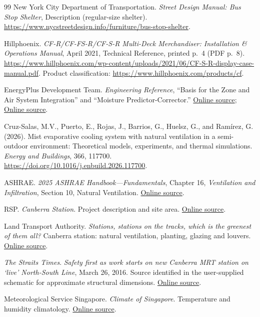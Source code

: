 \begin{thebibliography}{99}
New York City Department of Transportation.
\emph{Street Design Manual: Bus Stop Shelter}, Description (regular-size shelter).
\url{https://www.nycstreetdesign.info/furniture/bus-stop-shelter}.


Hillphoenix. \emph{CF-R/CF-FS-R/CF-S-R Multi-Deck Merchandiser: Installation \& Operations Manual}, April 2021, Technical Reference, printed p.~4 (PDF p.~8).
\url{https://www.hillphoenix.com/wp-content/uploads/2021/06/CF-S-R-display-case-manual.pdf}.
Product classification: \url{https://www.hillphoenix.com/products/cf}.


EnergyPlus Development Team. \emph{Engineering Reference},
``Basis for the Zone and Air System Integration'' and ``Moisture Predictor-Corrector.''
\href{https://energyplus.readthedocs.io/en/latest/guides/engineering-reference/2.1-basis-for-the-zone-and-air-system-integration.html}{Online source};
\href{https://energyplus.readthedocs.io/en/latest/guides/engineering-reference/2.4-moisture-predictor-corrector.html}{Online source}.


Cruz-Salas, M.V., Puerto, E., Rojas, J., Barrios, G., Huelsz, G., and Ram\'irez, G. (2026).
Mist evaporative cooling system with natural ventilation in a semi-outdoor environment: Theoretical models, experiments, and thermal simulations.
\emph{Energy and Buildings}, 366, 117700.
\url{https://doi.org/10.1016/j.enbuild.2026.117700}.

ASHRAE. \emph{2025 ASHRAE Handbook---Fundamentals}, Chapter 16,
\emph{Ventilation and Infiltration}, Section 10, Natural Ventilation.
\href{https://handbook.ashrae.org/Handbooks/F25/SI/F25_Ch16/F25_Ch16_si.aspx}{Online source}.


RSP. \emph{Canberra Station}. Project description and site area.
\href{https://rsp.design/project/canberrastation/}{Online source}. 

Land Transport Authority. \emph{Stations, stations on the tracks, which is the greenest of them all?}
Canberra station: natural ventilation, planting, glazing and louvers.
\href{https://www.lta.gov.sg/content/ltagov/en/who_we_are/statistics_and_publications/Connect/greenmrtstations.html}{Online source}.


\emph{The Straits Times}. \emph{Safety first as work starts on new Canberra MRT station on `live' North-South Line}, March 26, 2016.
Source identified in the user-supplied schematic for approximate structural dimensions.
\href{https://www.straitstimes.com/singapore/safety-first-as-work-starts-on-new-canberra-mrt-station-on-live-north-south-line}{Online source}.

Meteorological Service Singapore. \emph{Climate of Singapore}. Temperature and humidity climatology.
\href{https://www.weather.gov.sg/climate-climate-of-singapore}{Online source}. 


\end{thebibliography}